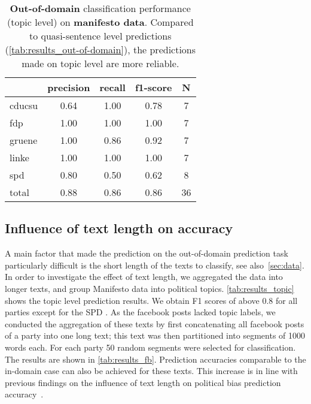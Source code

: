 \documentclass[11pt]{article}
\begin{document}
\begin{table}[t]
\caption{
\label{tab:results_topic}
{\bf Out-of-domain} classification performance (topic level) on {\bf manifesto data}. Compared to quasi-sentence level predictions (\autoref{tab:results_out-of-domain}), the predictions made on topic level are more reliable.}
\begin{center}
\begin{tabular}{lcccc}
    &         precision    &recall &  f1-score  & N  \\
    \hline
        \hline
cducsu     &  0.64  &    1.00  &    0.78    &     7\\
       fdp    &   1.00    &  1.00    &  1.00    &     7\\
    gruene  &     1.00  &    0.86  &    0.92    &     7\\
     linke    &   1.00   &   1.00     & 1.00    &     7\\
       spd   &    0.80   &   0.50    &  0.62     &    8\\
    \hline
total  &     0.88   &   0.86   &   0.86  &      36\\
\end{tabular}
\end{center}
\end{table}


\subsection{Influence of text length on accuracy}
A main factor that made the prediction on the out-of-domain prediction task particularly difficult is the short length of the texts to classify, see also~\autoref{sec:data}. In order to investigate the effect of text length, we aggregated the data into longer texts, and group Manifesto data into political topics. \autoref{tab:results_topic} shows the topic level prediction results. We obtain F1 scores of above 0.8 for all parties except for the SPD . As the facebook posts lacked topic labels, we conducted the aggregation of these texts by first concatenating all facebook posts of a party into one long text; this text was then partitioned into segments of 1000 words each. For each party 50 random segments were selected for classification. The results are shown in \autoref{tab:results_fb}. Prediction accuracies comparable to the in-domain case can also be achieved for these texts. This increase is in line with previous findings on the influence of text length on political bias prediction accuracy~\cite{Hirst2014}. 
\end{document}
